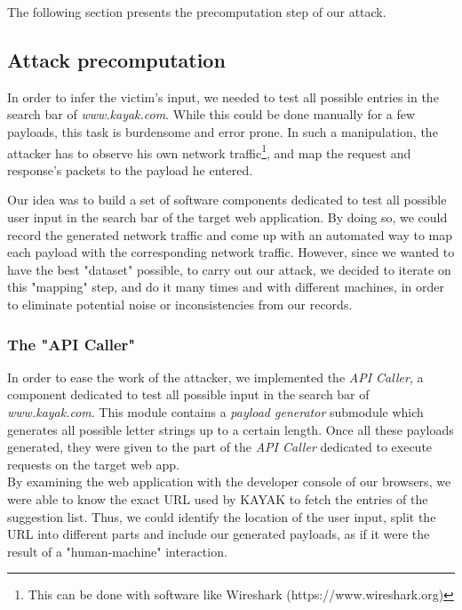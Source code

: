 \documentclass[journal]{IEEEtran}
\begin{document}
\medskip

The following section presents the precomputation step of our attack.

\subsection{Attack precomputation}

In order to infer the victim's input, we needed to test all possible entries in the search bar of \emph{www.kayak.com}. While this could be done manually for a few payloads, this task is burdensome and error prone. In such a manipulation, the attacker has to observe his own network traffic\footnote{This can be done with software like Wireshark (https://www.wireshark.org)}, and map the request and response's packets to the payload he entered.

\medskip

Our idea was to build a set of software components dedicated to test all possible user input in the search bar of the target web application. By doing so, we could record the generated network traffic and come up with an automated way to map each payload with the corresponding network traffic. However, since we wanted to have the best "dataset" possible, to carry out our attack, we decided to iterate on this "mapping" step, and do it many times and with different machines, in order to eliminate potential noise or inconsistencies from our records.

\bigskip

\subsubsection*{The "API Caller"}

In order to ease the work of the attacker, we implemented the \emph{API Caller}, a component dedicated to test all possible input in the search bar of \emph{www.kayak.com}. This module contains a \emph{payload generator} submodule which generates all possible letter strings up to a certain length. Once all these payloads generated, they were given to the part of the \emph{API Caller} dedicated to execute requests on the target web app. \\

By examining the web application with the developer console of our browsers, we were able to know the exact URL used by KAYAK to fetch the entries of the suggestion list. Thus, we could identify the location of the user input, split the URL into different parts and include our generated payloads, as if it were the result of a "human-machine" interaction.
\end{document}
